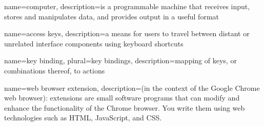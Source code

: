 {
  name=computer,
  description={is a programmable machine that receives input,
               stores and manipulates data, and provides
               output in a useful format}
}




{
  name=access keys,
  description={a means for users to travel between distant or unrelated interface components using keyboard shortcuts}
}

{
  name=key binding,
  plural=key bindings,
  description={mapping of keys, or combinations thereof, to actions}
}

{
  name=web browser extension,
  description={(in the context of the Google Chrome web browser): extensions are small software programs that can modify and enhance the functionality of the Chrome browser. You write them using web technologies such as HTML, JavaScript, and CSS.}
}
